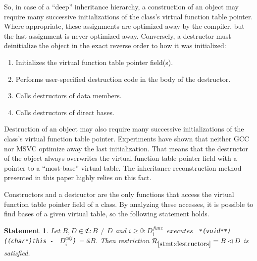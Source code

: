 \documentclass[times, 10pt,twocolumn]{article}
\newcommand{\gC}{\mathfrak{C}}
\newcommand{\cR}{\mathcal{R}}
\newcommand{\executes}{\textit{executes}}
\newcommand{\func}{\textit{func}}
\newcommand{\adj}{\textit{adj}}
\newtheorem{statement}{Statement}
\begin{document}
So, in case of a ``deep'' inheritance hierarchy,
a construction of an object may require many
successive initializations of the class's virtual function table pointer.
Where appropriate, these assignments are optimized away by the compiler,
but the last assignment is never optimized away.
Conversely, a destructor must deinitialize the object
in the exact reverse order to how it was initialized:
\begin{enumerate}\compact
\item Initializes the virtual function table pointer field(s).
\item Performs user-specified destruction code in the body of the destructor.
\item Calls destructors of data members.
\item Calls destructors of direct bases.
\end{enumerate}

Destruction of an object may also require many successive
initializations of the class's virtual function table pointer.
Experiments have shown that neither GCC nor MSVC optimize away
the last initialization.
That means that the destructor of the object always overwrites
the virtual function table pointer field with a pointer
to a ``most-base'' virtual table.
The inheritance reconstruction method presented in this paper
highly relies on this fact.

Constructors and a destructor are the only functions
that access the virtual function table pointer field of a class.
By analyzing these accesses, it is possible to find bases
of a given virtual table,
%
so the following statement holds.
\begin{statement}\label{stmt:destructors}
Let $B, D \in \gC: B \ne D$ and
$i \ge 0: D_i^{\func} \enspace \executes \enspace $ \lstinline{*(void**)((char*)this - } $D_i^{\adj}$\lstinline{)} = \lstinline{&}$B$.
Then restriction $\cR_{\ref{stmt:destructors}} = B \lhd D$ is satisfied.
\end{statement}
\end{document}
